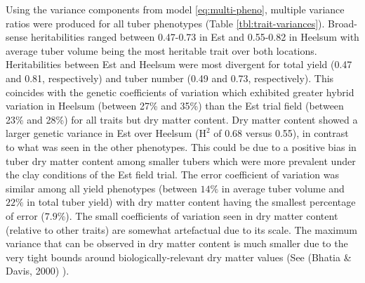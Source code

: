 \begin{refsection}
Using the variance components from model \ref{eq:multi-pheno}, multiple variance ratios were produced for all tuber phenotypes (Table \ref{tbl:trait-variances}). Broad-sense heritabilities ranged between 0.47-0.73 in Est and 0.55-0.82 in Heelsum with average tuber volume being the most heritable trait over both locations. Heritabilities between Est and Heelsum were most divergent for total yield (0.47 and 0.81, respectively) and tuber number (0.49 and 0.73, respectively). This coincides with the genetic coefficients of variation which exhibited greater hybrid variation in Heelsum (between 27\% and 35\%) than the Est trial field (between 23\% and 28\%) for all traits but dry matter content. Dry matter content showed a larger genetic variance in Est over Heelsum (\(\mathrm H^2\) of 0.68 versus 0.55), in contrast to what was seen in the other phenotypes. This could be due to a positive bias in tuber dry matter content among smaller tubers which were more prevalent under the clay conditions of the Est field trial. The error coefficient of variation was similar among all yield phenotypes (between \(14\%\) in average tuber volume and \(22\%\) in total tuber yield) with dry matter content having the smallest percentage of error (\(7.9\%\)). The small coefficients of variation seen in dry matter content (relative to other traits) are somewhat artefactual due to its scale. The maximum variance that can be observed in dry matter content is much smaller due to the very tight bounds around biologically-relevant dry matter values (See (Bhatia & Davis, 2000) \parencite{Bhatia2000}).

\begin{table}[H]
\caption{Variance components for the GCA and GCA+SCA genetic models for percentage dry matter conten (DM), total tuber number (TN), average tuber volume (TV), and total tuber yield (TY). Included are the variances attributed to general combining ability, hybrid by trial interaction, specific combining ability, genetic residual, and the proportions of genetic variance among each genetic component.}
\label{tbl:genmod-vars}
\centering
{}
\end{table}
\end{refsection}

